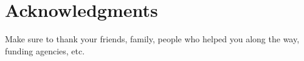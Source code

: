 \chapter{Acknowledgments}

Make sure to thank your friends, family, people who helped you along the way, funding agencies, etc.
